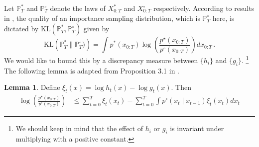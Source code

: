 \documentclass[11pt,reqno]{amsart}
\newcommand{\PP}{\mathbb{P}}
\theoremstyle{definition}
\newtheorem{lem}[thm]{Lemma}
\newcommand{\KL}[2]{\mathrm{KL}\left(#1 \| #2\right)}
\def \pcirc {p^\circ}
\def \pstar {p^\star}
\begin{document}
Let  $\mathbb{P}_T^*$ and $\mathbb{P}_T^\circ$ denote the laws of  $X_{0:T}^*$ and  $X_{0:T}^\circ$ respectively. 
According to results in \cite{chatterjee2018sample}, the quality of an importance sampling distribution, which is $\PP^\circ_T$ here, is dictated by $\text{KL}(\mathbb{P}_T^*, \mathbb{P}_T^\circ)$ given by
\[
 \KL{\mathbb{P}_T^*}{\mathbb{P}_T^\circ)} = \int p^*(x_{0:T}) \log \left(\frac{\pstar(x_{0:T})}{\pcirc(x_{0:T})}\right) dx_{0:T} \, .
\]
We would like to bound this by a discrepancy measure between $\{h_i\}$ and $\{g_i\}$. \footnote{We should keep in mind that the effect of $h_i$ or $g_i$ is invariant under multiplying with a positive constant.} The following lemma is adapted from Proposition 3.1 in \cite{ju2021sequential}. 
\begin{lem}\label{lem:kl} Define $\xi_t(x)=\log h_t(x)-\log g_t(x)$. Then 
\begin{align*}
	\log \left(\frac{\pstar(x_{0:T})}{\pcirc(x_{0:T})}\right)&\le  \sum_{t = 0}^T \xi_t(x_t)  -  
\sum_{t = 0}^T\int \pcirc(x_t \mid x_{t - 1}) \xi_t(x_t) dx_t 
\end{align*}
	\end{lem}
\end{document}
